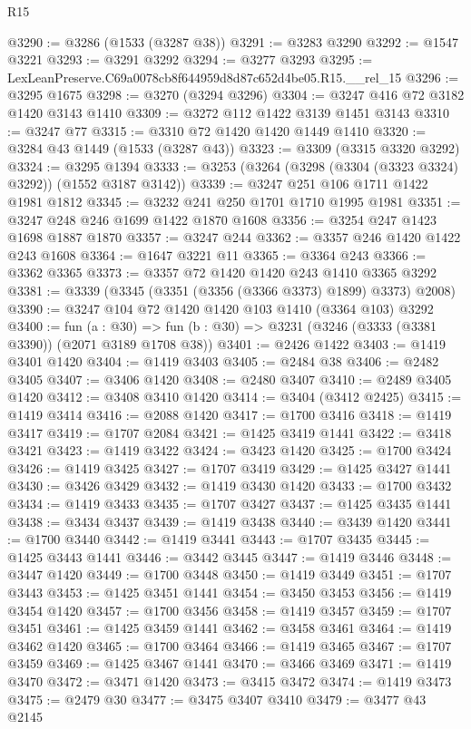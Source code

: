 \begin{lexlean}{R15}
\begin{coremodule}
@3290 := @3286 (@1533 (@3287 @38))
@3291 := @3283 @3290
@3292 := @1547 @3221
@3293 := @3291 @3292
@3294 := @3277 @3293
@3295 := LexLeanPreserve.C69a0078cb8f644959d8d87c652d4be05.R15.__rel_15
@3296 := @3295 @1675
@3298 := @3270 (@3294 @3296)
@3304 := @3247 @416 @72 @3182 @1420 @3143 @1410
@3309 := @3272 @112 @1422 @3139 @1451 @3143
@3310 := @3247 @77
@3315 := @3310 @72 @1420 @1420 @1449 @1410
@3320 := @3284 @43 @1449 (@1533 (@3287 @43))
@3323 := @3309 (@3315 @3320 @3292)
@3324 := @3295 @1394
@3333 := @3253 (@3264 (@3298 (@3304 (@3323 @3324) @3292)) (@1552 @3187 @3142))
@3339 := @3247 @251 @106 @1711 @1422 @1981 @1812
@3345 := @3232 @241 @250 @1701 @1710 @1995 @1981
@3351 := @3247 @248 @246 @1699 @1422 @1870 @1608
@3356 := @3254 @247 @1423 @1698 @1887 @1870
@3357 := @3247 @244
@3362 := @3357 @246 @1420 @1422 @243 @1608
@3364 := @1647 @3221 @11
@3365 := @3364 @243
@3366 := @3362 @3365
@3373 := @3357 @72 @1420 @1420 @243 @1410 @3365 @3292
@3381 := @3339 (@3345 (@3351 (@3356 (@3366 @3373) @1899) @3373) @2008)
@3390 := @3247 @104 @72 @1420 @1420 @103 @1410 (@3364 @103) @3292
@3400 := fun (a : @30) =>
  fun (b : @30) => @3231 (@3246 (@3333 (@3381 @3390)) (@2071 @3189 @1708 @38))
@3401 := @2426 @1422
@3403 := @1419 @3401 @1420
@3404 := @1419 @3403
@3405 := @2484 @38
@3406 := @2482 @3405
@3407 := @3406 @1420
@3408 := @2480 @3407
@3410 := @2489 @3405 @1420
@3412 := @3408 @3410 @1420
@3414 := @3404 (@3412 @2425)
@3415 := @1419 @3414
@3416 := @2088 @1420
@3417 := @1700 @3416
@3418 := @1419 @3417
@3419 := @1707 @2084
@3421 := @1425 @3419 @1441
@3422 := @3418 @3421
@3423 := @1419 @3422
@3424 := @3423 @1420
@3425 := @1700 @3424
@3426 := @1419 @3425
@3427 := @1707 @3419
@3429 := @1425 @3427 @1441
@3430 := @3426 @3429
@3432 := @1419 @3430 @1420
@3433 := @1700 @3432
@3434 := @1419 @3433
@3435 := @1707 @3427
@3437 := @1425 @3435 @1441
@3438 := @3434 @3437
@3439 := @1419 @3438
@3440 := @3439 @1420
@3441 := @1700 @3440
@3442 := @1419 @3441
@3443 := @1707 @3435
@3445 := @1425 @3443 @1441
@3446 := @3442 @3445
@3447 := @1419 @3446
@3448 := @3447 @1420
@3449 := @1700 @3448
@3450 := @1419 @3449
@3451 := @1707 @3443
@3453 := @1425 @3451 @1441
@3454 := @3450 @3453
@3456 := @1419 @3454 @1420
@3457 := @1700 @3456
@3458 := @1419 @3457
@3459 := @1707 @3451
@3461 := @1425 @3459 @1441
@3462 := @3458 @3461
@3464 := @1419 @3462 @1420
@3465 := @1700 @3464
@3466 := @1419 @3465
@3467 := @1707 @3459
@3469 := @1425 @3467 @1441
@3470 := @3466 @3469
@3471 := @1419 @3470
@3472 := @3471 @1420
@3473 := @3415 @3472
@3474 := @1419 @3473
@3475 := @2479 @30
@3477 := @3475 @3407 @3410
@3479 := @3477 @43 @2145

\end{coremodule}
\end{lexlean}

